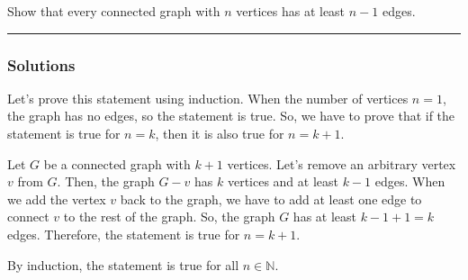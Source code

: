 \newpage
\begin{question}
Show that every connected graph with $n$ vertices has at least $n-1$ edges.
\end{question}

\par\noindent\rule{\textwidth}{0.5pt}

\subsubsection*{Solutions}
Let's prove this statement using induction. When the number of vertices $n = 1$, the graph has no edges, so the statement is true. So, we have to prove that if the statement is true for $n = k$, then it is also true for $n = k + 1$.

\bigskip
Let $G$ be a connected graph with $k + 1$ vertices. Let's remove an arbitrary vertex $v$ from $G$. Then, the graph $G - v$ has $k$ vertices and at least $k - 1$ edges. When we add the vertex $v$ back to the graph, we have to add at least one edge to connect $v$ to the rest of the graph. So, the graph $G$ has at least $k - 1 + 1 = k$ edges. Therefore, the statement is true for $n = k + 1$.

\bigskip
By induction, the statement is true for all $n \in \mathbb{N}$.

